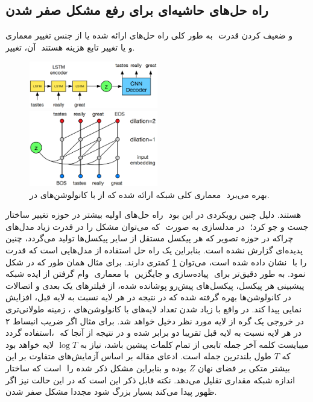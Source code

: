 \subsection{راه حل‌های حاشیه‌ای برای رفع مشکل صفر شدن }
به طور کلی راه حل‌های ارائه شده یا از جنس تغییر معماری ‎\decoder{}‎ و ضعیف کردن قدرت ‎\autoregressive{}‎ آن، تغییر ‎\priordist{}‎ و یا تغییر تابع هزینه هستند.
\\
\begin{figure}[H]
	\centering
	\includegraphics[width=0.5\textwidth]{images/dialated-conv1.png}

	\vspace{0.5cm}

	\includegraphics[width=0.5\textwidth]{images/dialated-conv2.png}
	\caption{
		معماری کلی شبکه ارائه شده که از   با کانولوشن‌های \dilated{} در  ‎\decoder{}‎ بهره می‌برد.
	}
	\label{fig:dialted_conv}
\end{figure}
راه حل‌های اولیه بیشتر در حوزه تغییر ساختار ‎\decoder{}‎ هستند. دلیل چنین رویکردی در این بود که می‌توان مشکل را در قدرت زیاد مدل‌های ‎‎ در مدلسازی به صورت ‎\autoregressive{}‎ جست و جو کرد؛ چراکه در حوزه تصویر که هر پیکسل مستقل از سایر پیکسل‌ها تولید می‌گردد، چنین پدیده‌ای گزارش نشده است. بنابراین یک راه حل استفاده از مدل‌هایی است که قدرت \autoregressive{} کمتری دارند. برای مثال همان طور که در شکل ‎\ref{fig:dialted_conv}‎ نشان داده شده است، می‌توان ‎\decoder{}‎ را با وام گرفتن از ایده شبکه ‎‎ با معماری ‎‎ پیاده‌سازی و جایگزین ‎‎ نمود. به طور دقیق‌تر برای پیشبینی هر پیکسل، پیکسل‌های پیش‌رو پوشانده شده، از فیلتر‌های یک بعدی و اتصالات
در کانولوشن‌ها بهره گرفته شده که در نتیجه 
در هر لایه نسبت به لایه قبل، افزایش نمایی پیدا کند. در واقع با زیاد شدن تعداد لایه‌های با کانولوشن‌های \dilated{}، زمینه طولانی‌تری در خروجی یک گره از لایه مورد نظر دخیل خواهد شد. برای مثال اگر ضریب انبساط ۲ استفاده گردد، \receiptivefield{}‎ در هر لایه نسبت به لایه قبل تقریبا دو برابر شده و در نتیجه از آنجا که میبایست کلمه آخر جمله تابعی از تمام کلمات پیشین باشد،‌ نیاز به $‎\log T$ لایه خواهد بود که $T$ طول بلندترین جمله است. ادعای مقاله بر اساس آزمایش‌های متفاوت بر این است که ساختار ‎‎ بیشتر متکی بر فضای نهان  $Z$ بوده و بنابراین مشکل ذکر شده را مقداری تقلیل می‌دهد. نکته قابل ذکر این است که در این حالت نیز اگر ‎اندازه شبکه بسیار بزرگ شود مجددا مشکل صفر شدن ‎‎ ظهور پیدا می‌کند.

